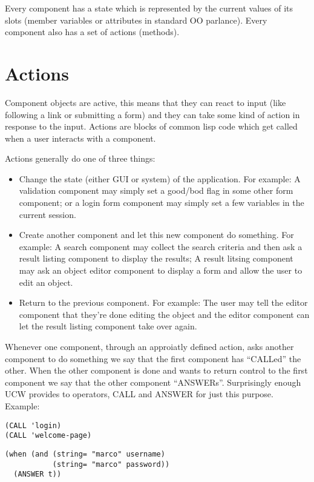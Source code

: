 \documentclass[a4paper]{article}
\newcommand{\ucw}{\textsc{UCW}}
\newcommand{\sym}[1]{\textsc{#1}}
\begin{document}
Every component has a state which is represented by the current values
of its slots (member variables or attributes in standard OO
parlance). Every component also has a set of actions (methods).

\section{Actions}

Component objects are active, this means that they can react to input
(like following a link or submitting a form) and they can take some
kind of action in response to the input. Actions are blocks of common
lisp code which get called when a user interacts with a component.

Actions generally do one of three things:

\begin{itemize}
\item Change the state (either GUI or system) of the application. For
  example: A validation component may simply set a good/bod flag in
  some other form component; or a login form component may simply set
  a few variables in the current session.
\item Create another component and let this new component do
  something. For example: A search component may collect the search
  criteria and then ask a result listing component to display the
  results; A result litsing component may ask an object editor
  component to display a form and allow the user to edit an object.
\item Return to the previous component. For example: The user may tell
  the editor component that they're done editing the object and the
  editor component can let the result listing component take over
  again.
\end{itemize}

Whenever one component, through an approiatly defined action, asks
another component to do something we say that the first component has
``CALLed'' the other. When the other component is done and wants to
return control to the first component we say that the other component
``ANSWERs''. Surprisingly enough \ucw{} provides to operators,
\sym{CALL} and \sym{ANSWER} for just this purpose. Example:

\begin{verbatim}
(CALL 'login)
(CALL 'welcome-page)
\end{verbatim}

\begin{verbatim}
(when (and (string= "marco" username)
           (string= "marco" password))
  (ANSWER t))
\end{verbatim}
\end{document}
